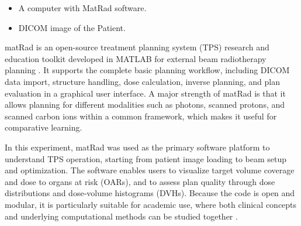 \begin{itemize}
    \item A computer with MatRad software.
    \item DICOM image of the Patient.
\end{itemize}

matRad is an open-source treatment planning system (TPS) research and education toolkit developed in MATLAB for external beam radiotherapy planning \cite{wieser_development_2017}. It supports the complete basic planning workflow, including DICOM data import, structure handling, dose calculation, inverse planning, and plan evaluation in a graphical user interface. A major strength of matRad is that it allows planning for different modalities such as photons, scanned protons, and scanned carbon ions within a common framework, which makes it useful for comparative learning.

In this experiment, matRad was used as the primary software platform to understand TPS operation, starting from patient image loading to beam setup and optimization. The software enables users to visualize target volume coverage and dose to organs at risk (OARs), and to assess plan quality through dose distributions and dose-volume histograms (DVHs). Because the code is open and modular, it is particularly suitable for academic use, where both clinical concepts and underlying computational methods can be studied together \cite{wieser_development_2017}.

